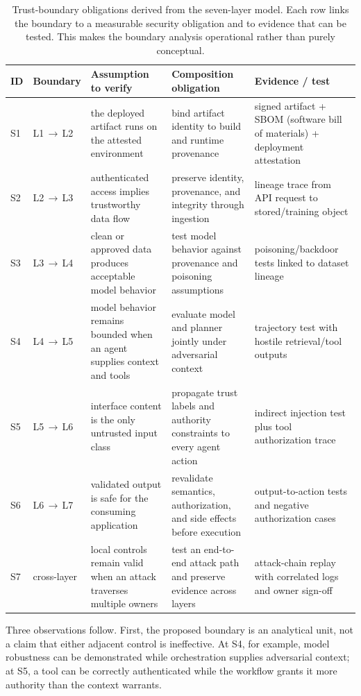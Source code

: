 \documentclass[runningheads]{llncs}
\begin{document}
\begin{table}[t]
\caption{Trust-boundary obligations derived from the seven-layer model. Each row links the boundary to a measurable security obligation and to evidence that can be tested. This makes the boundary analysis operational rather than purely conceptual.}
\label{tab:seams}
\centering
\small
\begin{tabular}{@{}p{0.7cm}p{2.25cm}p{2.55cm}p{3.05cm}p{3.0cm}@{}}
\toprule
\textbf{ID} & \textbf{Boundary} & \textbf{Assumption to verify} & \textbf{Composition obligation} & \textbf{Evidence / test}\\
\midrule
S1 & L1\,$\rightarrow$\,L2 & the deployed artifact runs on the attested environment & bind artifact identity to build and runtime provenance & signed artifact + SBOM (software bill of materials) + deployment attestation\\
S2 & L2\,$\rightarrow$\,L3 & authenticated access implies trustworthy data flow & preserve identity, provenance, and integrity through ingestion & lineage trace from API request to stored/training object\\
S3 & L3\,$\rightarrow$\,L4 & clean or approved data produces acceptable model behavior & test model behavior against provenance and poisoning assumptions & poisoning/backdoor tests linked to dataset lineage\\
S4 & L4\,$\rightarrow$\,L5 & model behavior remains bounded when an agent supplies context and tools & evaluate model and planner jointly under adversarial context & trajectory test with hostile retrieval/tool outputs\\
S5 & L5\,$\rightarrow$\,L6 & interface content is the only untrusted input class & propagate trust labels and authority constraints to every agent action & indirect injection test plus tool authorization trace\\
S6 & L6\,$\rightarrow$\,L7 & validated output is safe for the consuming application & revalidate semantics, authorization, and side effects before execution & output-to-action tests and negative authorization cases\\
S7 & cross-layer & local controls remain valid when an attack traverses multiple owners & test an end-to-end attack path and preserve evidence across layers & attack-chain replay with correlated logs and owner sign-off\\
\bottomrule
\end{tabular}
\end{table}

Three observations follow. First, the proposed boundary is an analytical unit, not a claim that either adjacent control is ineffective. At S4, for example, model robustness can be demonstrated while orchestration supplies adversarial context; at S5, a tool can be correctly authenticated while the workflow grants it more authority than the context warrants.
\end{document}
